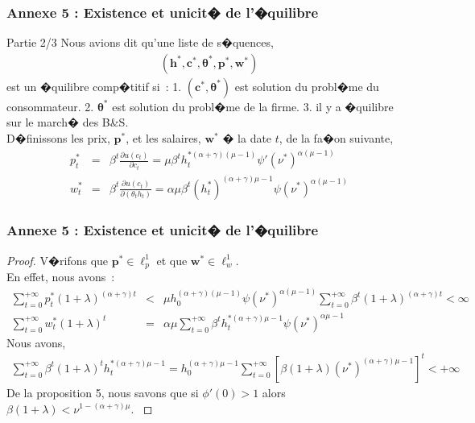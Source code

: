 \documentclass[10pt, hyperref={pdfpagemode=FullScreen}]{beamer} %
\begin{document}
\begin{frame}\label{annexe5part2}
\frametitle{Annexe 5 : Existence et unicit� de l'�quilibre}
\begin{block}{Partie 2/3}
\scriptsize{
Nous avions dit qu'une liste de s�quences,
\begin{eqnarray*}
(\mathbf{h}^{*}, \mathbf{c}^{*}, \mathbf{\theta}^{*}, \mathbf{p}^{*}, \mathbf{w}^{*})
\end{eqnarray*}
est un �quilibre comp�titif si~: 1. $(\mathbf{c}^{*},\mathbf{\theta}^{*})$ est solution du probl�me du consommateur. 2. $\mathbf{\theta}^{*}$ est solution du probl�me de la firme. 3. il y a �quilibre sur le march� des B\&S. \\
D�finissons les prix, $\mathbf{p}^{*}$, et les salaires, $\mathbf{w}^{*}$ � la date $t$, de la fa�on suivante, 
\begin{eqnarray*}
p_{t}^{*} &=& \beta^{t} \frac{\partial u(c_{t})}{\partial c_{t}} = \mu\beta^{t}h_{t}^{*(\alpha+\gamma)(\mu-1)}\psi'(\nu^{*})^{\alpha(\mu-1)} \\
w_{t}^{*} &=& \beta^{t} \frac{\partial u(c_{t})}{\partial (\theta_{t}h_{t})} = \alpha\mu\beta^{t}(h_{t}^{*})^{(\alpha+\gamma)\mu-1} \psi(\nu^{*})^{\alpha(\mu-1)}
\end{eqnarray*}
}
\end{block}
\end{frame}


\begin{frame}\label{annexe5part3}
\frametitle{Annexe 5 : Existence et unicit� de l'�quilibre}
\begin{proof}
\scriptsize{
V�rifons que $\mathbf{p}^{*}\in \ell_{p}^{1}$ et que $\mathbf{w}^{*}\in \ell_{w}^{1}$.\\
En effet, nous avons~: 
\begin{eqnarray*}
\sum_{t=0}^{+\infty} p_{t}^{*}(1+\lambda)^{(\alpha+\gamma)t} &<& \mu h_{0}^{(\alpha+\gamma)(\mu-1)} \psi(\nu^{*})^{\alpha(\mu-1)}\sum_{t=0}^{+\infty}\beta^{t}(1+\lambda)^{(\alpha+\gamma)t} < \infty \\
\sum_{t=0}^{+\infty} w_{t}^{*}(1+\lambda)^{t}&=& \alpha\mu\sum_{t=0}^{+\infty}\beta^{t}h_{t}^{*(\alpha+\gamma)\mu-1}\psi(\nu^{*})^{\alpha\mu-1} 
\end{eqnarray*}
Nous avons, 
\begin{eqnarray*}
\sum_{t=0}^{+\infty}\beta^{t}(1+\lambda)^{t}h_{t}^{*(\alpha+\gamma)\mu-1} = h_{0}^{(\alpha+\gamma)\mu-1}\sum_{t=0}^{+\infty}[\beta(1+\lambda)(\nu^{*})^{(\alpha+\gamma)\mu-1}]^{t}<+\infty
\end{eqnarray*}
De la proposition 5, nous savons que si $\phi'(0)>1$ alors $\beta(1+\lambda)<\nu^{1-(\alpha+\gamma)\mu}$.
}
\end{proof}
\end{frame}
\end{document}
